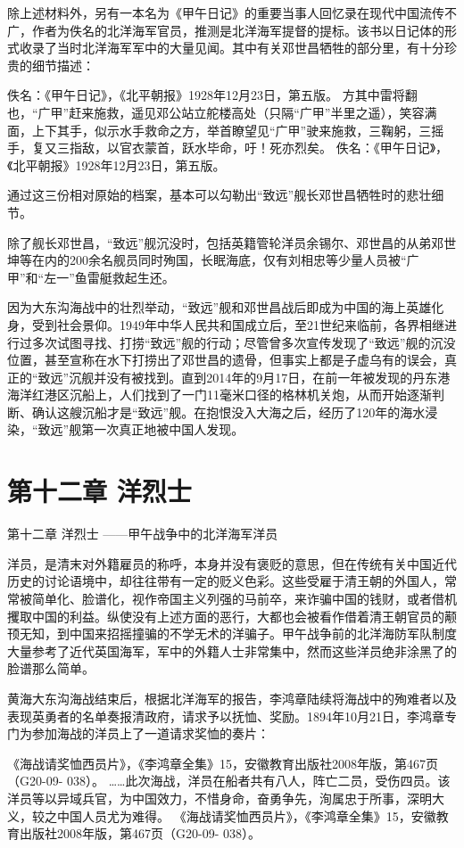 \documentclass[12pt,UTF8]{ctexbook}
\begin{document}
除上述材料外，另有一本名为《甲午日记》的重要当事人回忆录在现代中国流传不广，作者为佚名的北洋海军官员，推测是北洋海军提督的提标。该书以日记体的形式收录了当时北洋海军军中的大量见闻。其中有关邓世昌牺牲的部分里，有十分珍贵的细节描述：

佚名：《甲午日记》，《北平朝报》1928年12月23日，第五版。
方其中雷将翻也，“广甲”赶来施救，遥见邓公站立舵楼高处（只隔“广甲”半里之遥），笑容满面，上下其手，似示水手救命之方，举首瞭望见“广甲”驶来施救，三鞠躬，三摇手，复又三指敌，以官衣蒙首，跃水毕命，吁！死亦烈矣。 佚名：《甲午日记》，《北平朝报》1928年12月23日，第五版。

通过这三份相对原始的档案，基本可以勾勒出“致远”舰长邓世昌牺牲时的悲壮细节。

除了舰长邓世昌，“致远”舰沉没时，包括英籍管轮洋员余锡尔、邓世昌的从弟邓世坤等在内的200余名舰员同时殉国，长眠海底，仅有刘相忠等少量人员被“广甲”和“左一”鱼雷艇救起生还。

因为大东沟海战中的壮烈举动，“致远”舰和邓世昌战后即成为中国的海上英雄化身，受到社会景仰。1949年中华人民共和国成立后，至21世纪来临前，各界相继进行过多次试图寻找、打捞“致远”舰的行动；尽管曾多次宣传发现了“致远”舰的沉没位置，甚至宣称在水下打捞出了邓世昌的遗骨，但事实上都是子虚乌有的误会，真正的“致远”沉舰并没有被找到。直到2014年的9月17日，在前一年被发现的丹东港海洋红港区沉船上，人们找到了一门11毫米口径的格林机关炮，从而开始逐渐判断、确认这艘沉船才是“致远”舰。在抱恨没入大海之后，经历了120年的海水浸染，“致远”舰第一次真正地被中国人发现。

\chapter{第十二章 洋烈士}

第十二章
洋烈士
——甲午战争中的北洋海军洋员

洋员，是清末对外籍雇员的称呼，本身并没有褒贬的意思，但在传统有关中国近代历史的讨论语境中，却往往带有一定的贬义色彩。这些受雇于清王朝的外国人，常常被简单化、脸谱化，视作帝国主义列强的马前卒，来诈骗中国的钱财，或者借机攫取中国的利益。纵使没有上述方面的恶行，大都也会被看作借着清王朝官员的颟顸无知，到中国来招摇撞骗的不学无术的洋骗子。甲午战争前的北洋海防军队制度大量参考了近代英国海军，军中的外籍人士非常集中，然而这些洋员绝非涂黑了的脸谱那么简单。

黄海大东沟海战结束后，根据北洋海军的报告，李鸿章陆续将海战中的殉难者以及表现英勇者的名单奏报清政府，请求予以抚恤、奖励。1894年10月21日，李鸿章专门为参加海战的洋员上了一道请求奖恤的奏片：

《海战请奖恤西员片》，《李鸿章全集》15，安徽教育出版社2008年版，第467页（G20-09- 038）。
……此次海战，洋员在船者共有八人，阵亡二员，受伤四员。该洋员等以异域兵官，为中国效力，不惜身命，奋勇争先，洵属忠于所事，深明大义，较之中国人员尤为难得。 《海战请奖恤西员片》，《李鸿章全集》15，安徽教育出版社2008年版，第467页（G20-09- 038）。
\end{document}
